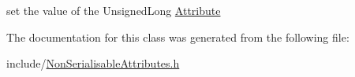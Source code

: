 set the value of the Unsigned\+Long \hyperlink{classcfglib_1_1Attribute}{Attribute} 

The documentation for this class was generated from the following file\+:\begin{DoxyCompactItemize}
\item 
include/\hyperlink{NonSerialisableAttributes_8h}{Non\+Serialisable\+Attributes.\+h}\end{DoxyCompactItemize}
